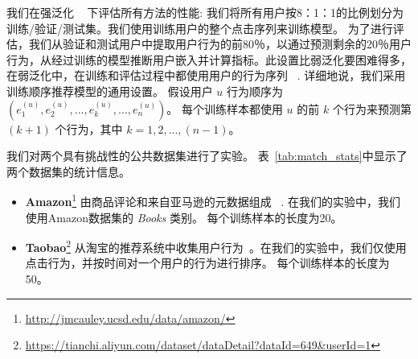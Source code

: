 我们在强泛化 ~\cite{marlin2004collaborative, liang2018variational, ma2019learning} 下评估所有方法的性能: 我们将所有用户按8：1：1的比例划分为训练/验证/测试集。我们使用训练用户的整个点击序列来训练模型。 为了进行评估，我们从验证和测试用户中提取用户行为的前80％，以通过预测剩余的20％用户行为，从经过训练的模型推断用户嵌入并计算指标。此设置比弱泛化要困难得多，在弱泛化中，在训练和评估过程中都使用用户的行为序列 ~\cite{liang2018variational}.
详细地说，我们采用训练顺序推荐模型的通用设置。 假设用户 $u$ 行为顺序为 $(e_1^{(u)}, e_2^{(u)}, ..., e_k^{(u)}, ..., e_n^{(u)})$。 每个训练样本都使用 $u$ 的前 $k$ 个行为来预测第 $(k+1)$ 个行为，其中 $k=1,2,...,(n-1)$。

 我们对两个具有挑战性的公共数据集进行了实验。 表~\ref{tab:match_stats}中显示了两个数据集的统计信息。

\begin{itemize}
    \item \textbf{Amazon}\footnote{\url{http://jmcauley.ucsd.edu/data/amazon/}} 由商品评论和来自亚马逊的元数据组成 ~\cite{mcauley2015image,he2016ups}. 在我们的实验中，我们使用Amazon数据集的 \textit{Books} 类别。 每个训练样本的长度为20。
    \item \textbf{Taobao}\footnote{\url{https://tianchi.aliyun.com/dataset/dataDetail?dataId=649\&userId=1}} 从淘宝的推荐系统中收集用户行为~\cite{zhu2018learning}。在我们的实验中，我们仅使用点击行为，并按时间对一个用户的行为进行排序。 每个训练样本的长度为50。
\end{itemize}

